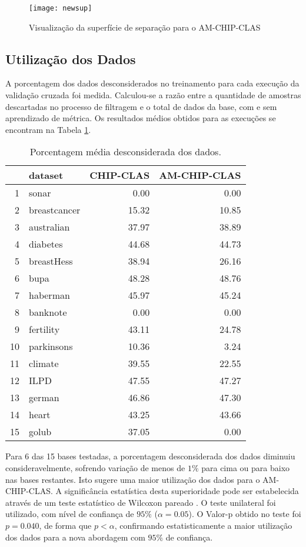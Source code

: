 \documentclass[
	12pt,				%
	openright,			%
	twoside,			%
	a4paper,			%
	english,			%
	spanish,			%
	brazil,				%
	]{abntex2}\usepackage[]{graphicx}\usepackage[]{color}
\begin{document}
\begin{figure}[ht]
\texttt{[image: newsup]}
\caption{Visualização da superfície de separação para o AM-CHIP-CLAS}
\label{supnova}
\end{figure}


\subsection{Utilização dos Dados}

A porcentagem dos dados desconsiderados no treinamento para cada execução da validação cruzada foi medida. Calculou-se a razão entre a quantidade de amostras descartadas no processo de filtragem e o total de dados da base, com e sem aprendizado de métrica. Os resultados médios obtidos para as execuções se encontram na Tabela \ref{dltab}.

\begin{table}[ht]
\centering
\caption{Porcentagem média desconsiderada dos dados.} 
\label{dltab}
\begin{tabular}{rlrr}
  \hline
 & dataset & CHIP-CLAS & AM-CHIP-CLAS \\ 
  \hline
1 & sonar & 0.00 & 0.00 \\ 
  2 & breastcancer & 15.32 & 10.85 \\ 
  3 & australian & 37.97 & 38.89 \\ 
  4 & diabetes & 44.68 & 44.73 \\ 
  5 & breastHess & 38.94 & 26.16 \\ 
  6 & bupa & 48.28 & 48.76 \\ 
  7 & haberman & 45.97 & 45.24 \\ 
  8 & banknote & 0.00 & 0.00 \\ 
  9 & fertility & 43.11 & 24.78 \\ 
  10 & parkinsons & 10.36 & 3.24 \\ 
  11 & climate & 39.55 & 22.55 \\ 
  12 & ILPD & 47.55 & 47.27 \\ 
  13 & german & 46.86 & 47.30 \\ 
  14 & heart & 43.25 & 43.66 \\ 
  15 & golub & 37.05 & 0.00 \\ 
   \hline
\end{tabular}
\end{table}
\par Para 6 das 15 bases testadas, a porcentagem desconsiderada dos dados diminuiu consideravelmente, sofrendo variação de menos de $1\%$ para cima ou para baixo nas bases restantes. Isto sugere uma maior utilização dos dados para o AM-CHIP-CLAS. A significância estatística desta superioridade pode ser estabelecida através de um teste estatístico de Wilcoxon pareado \cite{Demsar2006}. O teste unilateral foi utilizado, com nível de confiança de $95\%$ ($\alpha = 0.05$). O Valor-p obtido no teste foi $p = 0.040$, de forma que $p < \alpha$, confirmando estatisticamente a maior utilização dos dados para a nova abordagem com $95\%$ de confiança.
\end{document}
